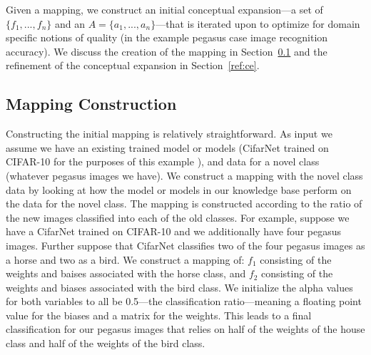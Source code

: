 \documentclass[letterpaper]{article}
\begin{document}
Given a mapping, we construct an initial conceptual expansion---a set of $\{f_1, ..., f_n\}$ and an $A=\{a_1, ..., a_n\}$---that is iterated upon to optimize for domain specific notions of quality (in the example pegasus case image recognition accuracy). 
We discuss the creation of the mapping in Section~\ref{ref:mapping} and the refinement of the conceptual expansion in Section~\ref{ref:ce}. 


\subsection{Mapping Construction}
\label{ref:mapping}

Constructing the initial mapping is relatively straightforward.
As input we assume we have an existing trained model or models (CifarNet trained on CIFAR-10 for the purposes of this example \cite{krizhevsky2009learning}), and data for a novel class (whatever pegasus images we have). We construct a mapping with the novel class data by looking at how the model or models in our knowledge base perform on the data for the novel class.
The mapping is constructed according to the ratio of the new images classified into each of the old classes. 
For example, suppose we have a CifarNet trained on CIFAR-10 and we additionally have four pegasus images.
Further suppose that CifarNet classifies two of the four pegasus images as a horse and two as a bird. 
We construct a mapping of: $f_1$ consisting of the weights and baises associated with the horse class, and $f_2$ consisting of the weights and biases associated with the bird class. We initialize the alpha values for both variables to all be 0.5---the classification ratio---meaning a floating point value for the biases and a matrix for the weights. This leads to a final classification for our pegasus images that relies on half of the weights of the house class and half of the weights of the bird class. 
\end{document}
